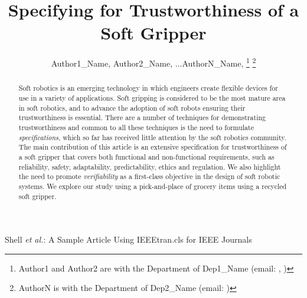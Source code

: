 \documentclass[lettersize,journal]{IEEEtran}
\begin{document}
\title{Specifying for Trustworthiness of a Soft Gripper}

\author{Author1\_Name, Author2\_Name, ...AuthorN\_Name,
	\thanks{Author1 and Author2 are with the Department of Dep1\_Name (email: , )}
	\thanks{AuthorN is with the Department of Dep2\_Name (email: )}}
%
{Shell \MakeLowercase{\textit{et al.}}: A Sample Article Using IEEEtran.cls for IEEE Journals}




\maketitle

\begin{abstract}
Soft robotics is an emerging technology in which engineers create flexible devices for use in a variety of applications. %
Soft gripping is considered to be the most mature area in soft robotics, and to advance the adoption of soft robots ensuring their trustworthiness is essential. 
There are a number of techniques for demonstrating trustworthiness and common to all these techniques is the need to formulate \emph{specifications}, which so far has received little attention by the soft robotics community.
The main contribution of this article is an extensive specification for trustworthiness of a soft gripper that covers both functional and non-functional requirements, such as reliability, safety, adaptability, predictability, ethics and regulation.  
We also highlight the need to promote \emph{verifiability} as a first-class objective in the design of soft robotic systems. 
We explore our study using a pick-and-place of grocery items using a recycled soft gripper.
\end{abstract}
\end{document}
